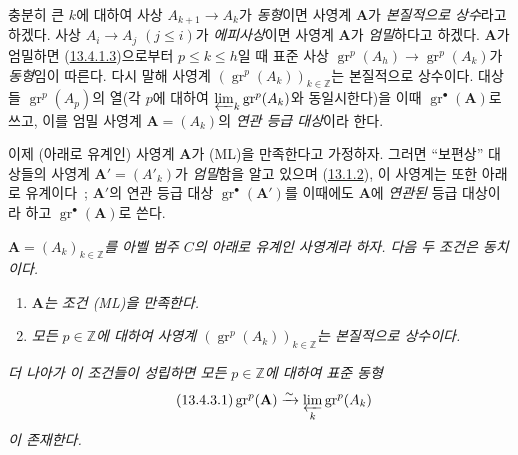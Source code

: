 \begin{env}[13.4.2]
\label{0.13.4.2-fr}
충분히 큰 $k$에 대하여 사상 $A_{k+1}\to A_k$가 \emph{동형}이면
사영계 $\mathbf A$가 \emph{본질적으로 상수}라고 하겠다. 사상
$A_i\to A_j$ $(j\leq i)$가 \emph{에피사상}이면 사영계 $\mathbf A$가
\emph{엄밀}하다고 하겠다. $\mathbf A$가 엄밀하면
(\hyperref[0.13.4.1.3-fr]{13.4.1.3})으로부터 $p\leq k\leq h$일 때
표준 사상 $\operatorname{gr}^p(A_h)\to\operatorname{gr}^p(A_k)$가
\emph{동형}임이 따른다. 다시 말해 사영계
$(\operatorname{gr}^p(A_k))_{k\in\mathbb Z}$는 본질적으로 상수이다.
대상들 $\operatorname{gr}^p(A_p)$의 열(각 $p$에 대하여
$\varprojlim_k\operatorname{gr}^p(A_k)$와 동일시한다)을 이때
$\operatorname{gr}^\bullet(\mathbf A)$로 쓰고, 이를 엄밀 사영계
$\mathbf A=(A_k)$의 \emph{연관 등급 대상}이라 한다.

이제 (아래로 유계인) 사영계 $\mathbf A$가 (ML)을 만족한다고
가정하자. 그러면 ``보편상'' 대상들의 사영계
$\mathbf A'=(A'_k)$가 \emph{엄밀}함을 알고 있으며
(\hyperref[0.13.1.2-fr]{13.1.2}), 이 사영계는 또한 아래로 유계이다~;
$\mathbf A'$의 연관 등급 대상 $\operatorname{gr}^\bullet(\mathbf A')$를
이때에도 $\mathbf A$에 \emph{연관된} 등급 대상이라 하고
$\operatorname{gr}^\bullet(\mathbf A)$로 쓴다.
\end{env}

\begin{proposition}[13.4.3]
\label{0.13.4.3-fr}
\emph{$\mathbf A=(A_k)_{k\in\mathbb Z}$를 아벨 범주 $C$의 아래로
유계인 사영계라 하자. 다음 두 조건은 동치이다.}
\begin{enumerate}
\item[\emph{a)}] \emph{$\mathbf A$는 조건 (ML)을 만족한다.}
\item[\emph{b)}] \emph{모든 $p\in\mathbb Z$에 대하여 사영계
$(\operatorname{gr}^p(A_k))_{k\in\mathbb Z}$는 본질적으로 상수이다.}
\end{enumerate}
\emph{더 나아가 이 조건들이 성립하면 모든 $p\in\mathbb Z$에 대하여
표준 동형}
\begin{equation}
\label{0.13.4.3.1-fr}
\tag{13.4.3.1}
\operatorname{gr}^p(\mathbf A)\xrightarrow{\sim}
\varprojlim_k\operatorname{gr}^p(A_k)
\end{equation}
\emph{이 존재한다.}
\end{proposition}

